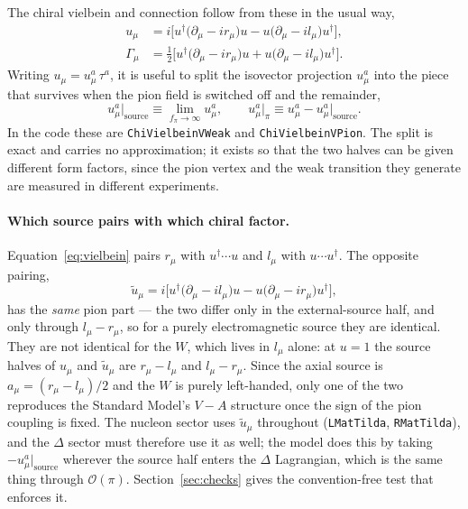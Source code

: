 \documentclass[11pt,a4paper]{article}
\newcommand{\code}[1]{\texttt{\small #1}}
\begin{document}
The chiral vielbein and connection follow from these in the usual way,
\begin{align}
  u_\mu &= i\Big[u^\dagger\big(\partial_\mu - i r_\mu\big)u
                 - u\big(\partial_\mu - i l_\mu\big)u^\dagger\Big],
  \label{eq:vielbein}\\
  \Gamma_\mu &= \tfrac12\Big[u^\dagger\big(\partial_\mu - i r_\mu\big)u
                 + u\big(\partial_\mu - i l_\mu\big)u^\dagger\Big].
\end{align}
Writing $u_\mu = u_\mu^a\,\tau^a$, it is useful to split the isovector
projection $u_\mu^a$ into the piece that survives when the pion field is
switched off and the remainder,
\begin{equation}
  u_\mu^{a}\Big|_{\text{source}} \equiv \lim_{f_\pi\to\infty} u_\mu^a ,
  \qquad
  u_\mu^{a}\Big|_{\pi} \equiv u_\mu^a - u_\mu^{a}\Big|_{\text{source}} .
  \label{eq:split}
\end{equation}
In the code these are \code{ChiVielbeinVWeak} and \code{ChiVielbeinVPion}. The
split is exact and carries no approximation; it exists so that the two halves
can be given different form factors, since the pion vertex and the weak
transition they generate are measured in different experiments.

\paragraph{Which source pairs with which chiral factor.}
Equation~\eqref{eq:vielbein} pairs $r_\mu$ with $u^\dagger\!\cdots\!u$ and
$l_\mu$ with $u\cdots u^\dagger$. The opposite pairing,
\begin{equation}
  \tilde u_\mu = i\Big[u^\dagger\big(\partial_\mu - i l_\mu\big)u
                 - u\big(\partial_\mu - i r_\mu\big)u^\dagger\Big],
  \label{eq:vielbein-tilde}
\end{equation}
has the \emph{same} pion part --- the two differ only in the external-source
half, and only through $l_\mu - r_\mu$, so for a purely electromagnetic source
they are identical. They are not identical for the $W$, which lives in $l_\mu$
alone: at $u=1$ the source halves of $u_\mu$ and $\tilde u_\mu$ are
$r_\mu - l_\mu$ and $l_\mu - r_\mu$. Since the axial source is
$a_\mu = (r_\mu - l_\mu)/2$ and the $W$ is purely left-handed, only one of the
two reproduces the Standard Model's $V-A$ structure once the sign of the pion
coupling is fixed. The nucleon sector uses $\tilde u_\mu$ throughout
(\code{LMatTilda}, \code{RMatTilda}), and the $\Delta$ sector must therefore use
it as well; the model does this by taking $-u_\mu^a|_{\text{source}}$ wherever
the source half enters the $\Delta$ Lagrangian, which is the same thing through
$\mathcal{O}(\pi)$. Section~\ref{sec:checks} gives the convention-free test that
enforces it.
\end{document}

